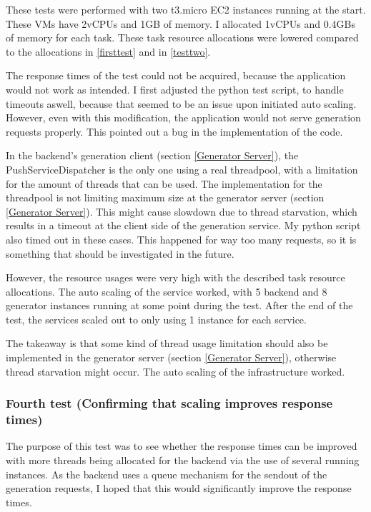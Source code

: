 				These tests were performed with two t3.micro EC2 instances running at the start. 
				These VMs have 2vCPUs and 1GB of memory. I allocated
				1vCPUs and 0.4GBs of memory for each task. 
				These task resource allocations were lowered compared to the allocations in \ref{firsttest} and in \ref{testtwo}.

				The response times of the test could not be acquired, because the application would not work as intended. 
				I first adjusted the python test script, to handle timeouts aswell, because that seemed to be an issue upon initiated 
				auto scaling. However, even with this modification, the application would not serve generation requests properly.
				This pointed out a bug in the implementation of the code.

				In the backend's generation client (section \ref{Generator Server}), the PushServiceDispatcher is the only one using a real threadpool, with a 
				limitation for the amount of threads that can be used. 
				The implementation for the threadpool is not limiting
				maximum size at the generator server (section \ref{Generator Server}). This might cause slowdown due to thread starvation, 
				which results in a timeout at the client side of the generation service.
				My python script also timed out in these cases. This happened for way too many 
				requests, so it is something that should be investigated in the future.

				However, the resource usages were very high with the described task resource allocations. The auto scaling of the service worked,
				with 5 backend and 8 generator instances running at some point during the test. After the end of the test, the services scaled out 
				to only using 1 instance for each service.

				The takeaway is that some kind of thread usage limitation should also be implemented in the generator server (section \ref{Generator Server}),
				otherwise thread starvation might occur. The auto scaling of the infrastructure worked.

			\subsubsection{Fourth test (Confirming that scaling improves response times)}
				The purpose of this test was to see whether the response times can be improved with more threads being allocated for the backend via 
				the use of several running instances.
				As the backend uses a queue mechanism for the sendout of the generation requests, I hoped that this would significantly improve the 
				response times.


